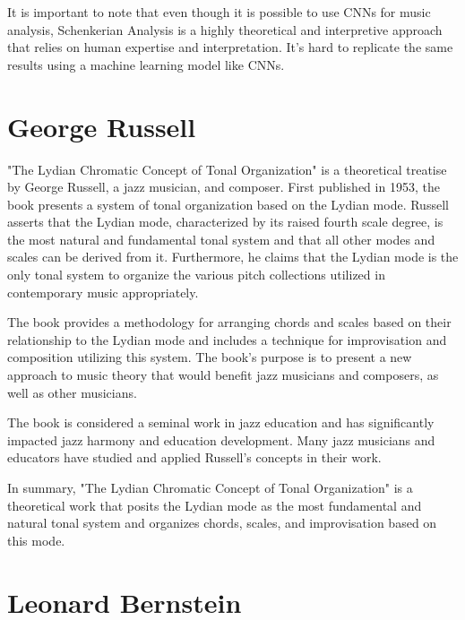 It is important to note that even though it is possible to use CNNs for music analysis, Schenkerian Analysis is a highly theoretical and interpretive approach that relies on human expertise and interpretation. It's hard to replicate the same results using a machine learning model like CNNs.

\section{George Russell}

"The Lydian Chromatic Concept of Tonal Organization" is a theoretical treatise by George Russell, a jazz musician, and composer. First published in 1953, the book presents a system of tonal organization based on the Lydian mode. Russell asserts that the Lydian mode, characterized by its raised fourth scale degree, is the most natural and fundamental tonal system and that all other modes and scales can be derived from it. Furthermore, he claims that the Lydian mode is the only tonal system to organize the various pitch collections utilized in contemporary music appropriately.

The book provides a methodology for arranging chords and scales based on their relationship to the Lydian mode and includes a technique for improvisation and composition utilizing this system. The book's purpose is to present a new approach to music theory that would benefit jazz musicians and composers, as well as other musicians.

The book is considered a seminal work in jazz education and has significantly impacted jazz harmony and education development. Many jazz musicians and educators have studied and applied Russell's concepts in their work.

In summary, "The Lydian Chromatic Concept of Tonal Organization" is a theoretical work that posits the Lydian mode as the most fundamental and natural tonal system and organizes chords, scales, and improvisation based on this mode.

\section{Leonard Bernstein}

